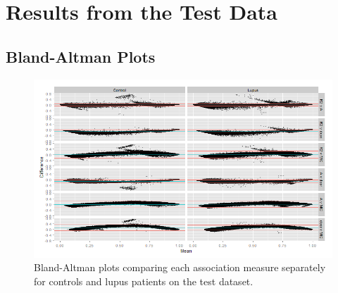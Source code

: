 \documentclass[a4paper, 12pt]{report}
\begin{document}
%

\chapter{Results from the Test Data}

\section{Bland-Altman Plots}
\begin{figure}[H]
\begin{center}
\includegraphics[width=\textwidth]{big2wayBA}
\caption{Bland-Altman plots comparing each association measure separately for controls and lupus patients on the test dataset.} 
\label{F:ba2way}
\end{center}
\end{figure}
\end{document}
